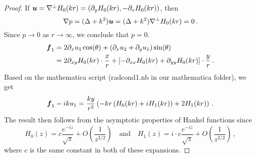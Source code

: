 \begin{proof}
If ${\boldsymbol u} = \nabla^{\perp} H_{0}(k r) = (\partial_{y} H_{0}(k r), 
-\partial_{x} H_{0}(k r))$, then
\begin{equation}
\nabla  p = (\Delta + k^2) {\boldsymbol u} = (\Delta + k^2) \nabla^{\perp} 
H_{0} (k r) = 0 \, .
\end{equation}
Since $p\to 0$ as $r\to \infty$, we conclude that $p=0$.
\begin{align}
{\boldsymbol f}_{1} &= 2\partial_{x} u_{1} \cos(\theta) + \left( \partial_{x} u_{2} + 
\partial_{y} u_{1} \right) \sin(\theta) \\
&= 2 \partial_{xy} H_{0}(k r) \cdot \frac{x}{r} +
\left[-\partial_{xx} H_{0}(k r) + \partial_{yy} H_{0}(k r) \right]
\cdot \frac{y}{r} \, .
\end{align}
Based on the mathematica script (radcond1.nb in our mathematica folder), we
get
\begin{equation}
{\boldsymbol f}_{1} - i k u_{1} = \frac{ky}{r^2} \left( -kr \left(H_{0}(k r) + 
i H_{1}(k r)\right) +
2 H_{1}(k r)\right) \, .
\end{equation}
The result then follows from the asymptotic properties of Hankel functions since
\begin{equation}
H_{0}(z) = c \frac{e^{-iz}}{\sqrt{z}} + O(\frac{1}{z^{3/2}}) \quad 
\text{and} \quad 
H_{1}(z) = i \cdot c \frac{e^{-iz}}{\sqrt{z}} + O(\frac{1}{z^{3/2}}) \,,
\end{equation}
where $c$ is the same constant in both of these expansions.
\end{proof}
